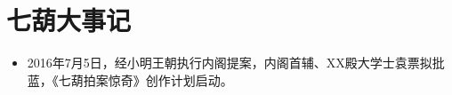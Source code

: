 \chapter{七葫大事记}

\begin{itemize}
    \item{2016年7月5日，经小明王朝执行内阁提案，内阁首辅、XX殿大学士袁票拟批蓝，《七葫拍案惊奇》创作计划启动。}
\end{itemize}
